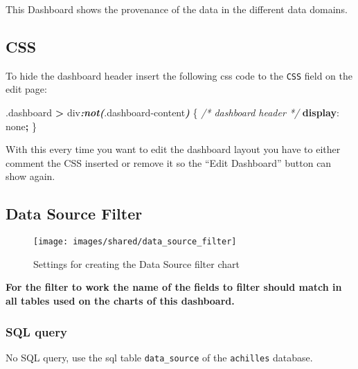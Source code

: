 \documentclass[
]{book}
\newenvironment{Shaded}{\begin{snugshade}}{\end{snugshade}}
\newcommand{\CommentTok}[1]{\textcolor[rgb]{0.56,0.35,0.01}{\textit{#1}}}
\newcommand{\DecValTok}[1]{\textcolor[rgb]{0.00,0.00,0.81}{#1}}
\newcommand{\FunctionTok}[1]{\textcolor[rgb]{0.00,0.00,0.00}{#1}}
\newcommand{\InformationTok}[1]{\textcolor[rgb]{0.56,0.35,0.01}{\textbf{\textit{#1}}}}
\newcommand{\KeywordTok}[1]{\textcolor[rgb]{0.13,0.29,0.53}{\textbf{#1}}}
\newcommand{\NormalTok}[1]{#1}
\newcommand{\OperatorTok}[1]{\textcolor[rgb]{0.81,0.36,0.00}{\textbf{#1}}}
\begin{document}
This Dashboard shows the provenance of the data in the different data domains.

\hypertarget{css-8}{%
\subsection*{CSS}\label{css-8}}

To hide the dashboard header insert the following css code to the \texttt{CSS} field on the edit page:

\begin{Shaded}
\begin{Highlighting}[]
\FunctionTok{.dashboard} \OperatorTok{\textgreater{}}\NormalTok{ div}\InformationTok{:not(}\FunctionTok{.dashboard{-}content}\InformationTok{)}\NormalTok{ \{  }\CommentTok{/* dashboard header */}
  \KeywordTok{display}\NormalTok{: }\DecValTok{none}\OperatorTok{;}
\NormalTok{\}}
\end{Highlighting}
\end{Shaded}

With this every time you want to edit the dashboard layout you have to either comment the CSS inserted
or remove it so the ``Edit Dashboard'' button can show again.

\hypertarget{data-source-filter-5}{%
\subsection*{Data Source Filter}\label{data-source-filter-5}}

\begin{figure}
\texttt{[image: images/shared/data\_source\_filter]} \caption{Settings for creating the Data Source filter chart}\label{fig:dataSourceFilter}
\end{figure}

\textbf{For the filter to work the name of the fields to filter should match in all tables used on the charts of this dashboard.}

\hypertarget{sql-query-23}{%
\subsubsection*{SQL query}\label{sql-query-23}}

No SQL query, use the sql table \texttt{data\_source} of the \texttt{achilles} database.
\end{document}
